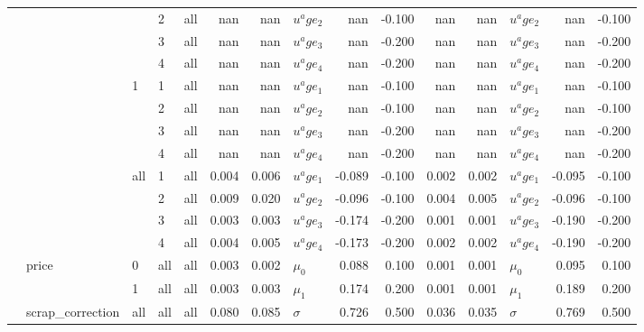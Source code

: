 \begin{tabular}{lllllrrlrrrrlrr}
 &  &  & 2 & all & nan & nan & $u^age_2$ & nan & -0.100 & nan & nan & $u^age_2$ & nan & -0.100 \\
 &  &  & 3 & all & nan & nan & $u^age_3$ & nan & -0.200 & nan & nan & $u^age_3$ & nan & -0.200 \\
 &  &  & 4 & all & nan & nan & $u^age_4$ & nan & -0.200 & nan & nan & $u^age_4$ & nan & -0.200 \\
 &  & \multirow[c]{4}{*}{1} & 1 & all & nan & nan & $u^age_1$ & nan & -0.100 & nan & nan & $u^age_1$ & nan & -0.100 \\
 &  &  & 2 & all & nan & nan & $u^age_2$ & nan & -0.100 & nan & nan & $u^age_2$ & nan & -0.100 \\
 &  &  & 3 & all & nan & nan & $u^age_3$ & nan & -0.200 & nan & nan & $u^age_3$ & nan & -0.200 \\
 &  &  & 4 & all & nan & nan & $u^age_4$ & nan & -0.200 & nan & nan & $u^age_4$ & nan & -0.200 \\
 &  & \multirow[c]{4}{*}{all} & 1 & all & 0.004 & 0.006 & $u^age_1$ & -0.089 & -0.100 & 0.002 & 0.002 & $u^age_1$ & -0.095 & -0.100 \\
 &  &  & 2 & all & 0.009 & 0.020 & $u^age_2$ & -0.096 & -0.100 & 0.004 & 0.005 & $u^age_2$ & -0.096 & -0.100 \\
 &  &  & 3 & all & 0.003 & 0.003 & $u^age_3$ & -0.174 & -0.200 & 0.001 & 0.001 & $u^age_3$ & -0.190 & -0.200 \\
 &  &  & 4 & all & 0.004 & 0.005 & $u^age_4$ & -0.173 & -0.200 & 0.002 & 0.002 & $u^age_4$ & -0.190 & -0.200 \\
 & \multirow[c]{2}{*}{price} & 0 & all & all & 0.003 & 0.002 & $\mu_0$ & 0.088 & 0.100 & 0.001 & 0.001 & $\mu_0$ & 0.095 & 0.100 \\
 &  & 1 & all & all & 0.003 & 0.003 & $\mu_1$ & 0.174 & 0.200 & 0.001 & 0.001 & $\mu_1$ & 0.189 & 0.200 \\
 & scrap_correction & all & all & all & 0.080 & 0.085 & $\sigma$ & 0.726 & 0.500 & 0.036 & 0.035 & $\sigma$ & 0.769 & 0.500 \\
\end{tabular}
